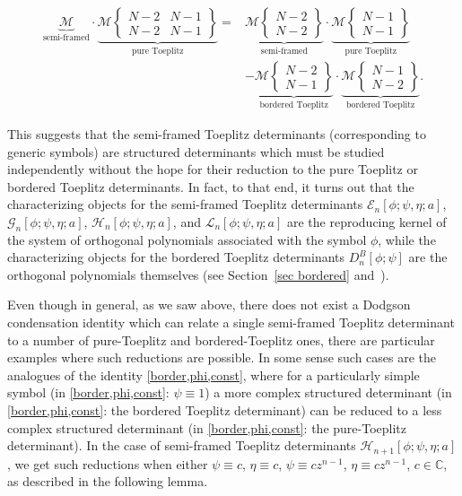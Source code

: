 \documentclass[pdftex]{sigma}
\numberwithin{equation}{section}
\newcommand{\C}{{\mathbb C}}
\begin{document}
		\begin{align*}%
 \underbrace{\mathscr{M}}_{\text{semi-framed}}
\cdot \underbrace{ \mathscr{M}\left\lbrace \begin{matrix} N-2 & N-1 \\ N-2 & N-1 \end{matrix} \right\rbrace }_{\text{pure Toeplitz}} ={}& \underbrace{ \mathscr{M}\left\lbrace \begin{matrix} N-2 \\ N-2 \end{matrix} \right\rbrace }_{\text{semi-framed}} \cdot \underbrace{ \mathscr{M}\left\lbrace \begin{matrix} N-1 \\ N-1 \end{matrix} \right\rbrace}_{\text{pure Toeplitz}} \\ &- \underbrace{ \mathscr{M}\left\lbrace \begin{matrix} N-2 \\ N-1 \end{matrix} \right\rbrace}_{\text{bordered Toeplitz}} \cdot \underbrace{ \mathscr{M}\left\lbrace \begin{matrix} N-1 \\ N-2 \end{matrix} \right\rbrace}_{\text{bordered Toeplitz}}.
		\end{align*}
		
		This suggests that the semi-framed Toeplitz determinants (corresponding to generic symbols) are structured determinants which must be studied independently without the hope for their reduction to the pure Toeplitz or bordered Toeplitz determinants. In fact, to that end, it turns out that the characterizing objects for the semi-framed Toeplitz determinants $\mathscr{E}_n[\phi;\psi,\eta;a]$, $\mathscr{G}_n[\phi;\psi,\eta;a]$, $\mathscr{H}_n[\phi;\psi,\eta;a]$, and $\mathscr{L}_n[\phi;\psi,\eta;a]$ are the reproducing kernel of the system of orthogonal polynomials associated with the symbol $\phi$, while the characterizing objects for the bordered Toeplitz determinants $D^B_n[\phi;\psi]$ are the orthogonal polynomials themselves (see Section~\ref{sec bordered} and~\cite{BEGIL}).
		
		Even though in general, as we saw above, there does not exist a Dodgson condensation identity which can relate a single semi-framed Toeplitz determinant to a number of pure-Toeplitz and bordered-Toeplitz ones, there are particular examples where such reductions are possible. In some sense such cases are the analogues of the identity \eqref{border,phi,const}, where for a particularly simple symbol (in \eqref{border,phi,const}: $\psi \equiv 1$) a more complex structured determinant (in \eqref{border,phi,const}: the bordered Toeplitz determinant) can be reduced to a less complex structured determinant (in \eqref{border,phi,const}: the pure-Toeplitz determinant). In the case of semi-framed Toeplitz determinants $\mathscr{H}_{n+1}[\phi;\psi,\eta;a]$, we get such reductions when either $\psi \equiv c$, $\eta \equiv c$, $\psi \equiv cz^{n-1}$, $\eta \equiv cz^{n-1}$, $c \in \C$, as described in the following lemma.
		
\end{document}
